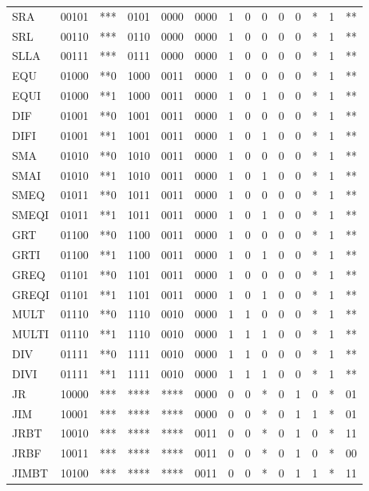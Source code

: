 \documentclass{article}
\begin{document}
\begin{longtable}{l c c c c c c c c c c c c c}
					SRA 	& 00101	& ***	&0101	&0000	&0000	&1	&0	&0	&0	&0	&*	&1	&**\\
					SRL 	& 00110	& ***	&0110	&0000	&0000	&1	&0	&0	&0	&0	&*	&1	&**\\
					SLLA 	& 00111	& ***	&0111	&0000	&0000	&1	&0	&0	&0	&0	&*	&1	&**\\
					EQU 	& 01000	& **0	&1000	&0011	&0000	&1	&0	&0	&0	&0	&*	&1	&**\\
					EQUI 	& 01000	& **1	&1000	&0011	&0000	&1	&0	&1	&0	&0	&*	&1	&**\\
					DIF 	& 01001	& **0	&1001	&0011	&0000	&1	&0	&0	&0	&0	&*	&1	&**\\
					DIFI 	& 01001	& **1	&1001	&0011	&0000	&1	&0	&1	&0	&0	&*	&1	&**\\
					SMA 	& 01010	& **0	&1010	&0011	&0000	&1	&0	&0	&0	&0	&*	&1	&**\\
					SMAI 	& 01010	& **1	&1010	&0011	&0000	&1	&0	&1	&0	&0	&*	&1	&**\\
					SMEQ 	& 01011	& **0	&1011	&0011	&0000	&1	&0	&0	&0	&0	&*	&1	&**\\
					SMEQI	& 01011	& **1	&1011	&0011	&0000	&1	&0	&1	&0	&0	&*	&1	&**\\
					GRT 	& 01100	& **0	&1100	&0011	&0000	&1	&0	&0	&0	&0	&*	&1	&**\\
					GRTI 	& 01100	& **1	&1100	&0011	&0000	&1	&0	&1	&0	&0	&*	&1	&**\\
					GREQ 	& 01101	& **0	&1101	&0011	&0000	&1	&0	&0	&0	&0	&*	&1	&**\\
					GREQI	& 01101	& **1	&1101	&0011	&0000	&1	&0	&1	&0	&0	&*	&1	&**\\
					MULT 	& 01110	& **0	&1110	&0010	&0000	&1	&1	&0	&0	&0	&*	&1	&**\\
					MULTI	& 01110	& **1	&1110	&0010	&0000	&1	&1	&1	&0	&0	&*	&1	&**\\
					DIV 	& 01111	& **0	&1111	&0010	&0000	&1	&1	&0	&0	&0	&*	&1	&**\\
					DIVI 	& 01111	& **1	&1111	&0010	&0000	&1	&1	&1	&0	&0	&*	&1	&**\\
					JR 		& 10000	& ***	&****	&****	&0000	&0	&0	&*	&0	&1	&0	&*	&01\\
					JIM 	& 10001	& ***	&****	&****	&0000	&0	&0	&*	&0	&1	&1	&*	&01\\
					JRBT 	& 10010	& ***	&****	&****	&0011	&0	&0	&*	&0	&1	&0	&*	&11\\
					JRBF 	& 10011	& ***	&****	&****	&0011	&0	&0	&*	&0	&1	&0	&*	&00\\
					JIMBT	& 10100	& ***	&****	&****	&0011	&0	&0	&*	&0	&1	&1	&*	&11\\

\end{longtable}
\end{document}
